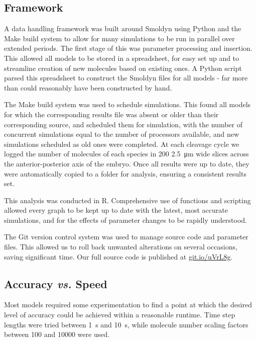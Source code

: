 \documentclass[11pt,a4paper,twocolumn]{article}
\begin{document}
\subsection{Framework}
A data handling framework was built around Smoldyn using Python and the Make build system to allow for many simulations to be run in parallel over extended periods. The first stage of this was parameter processing and insertion. This allowed all models to be stored in a spreadsheet, for easy set up and to streamline creation of new molecules based on existing ones. A Python script parsed this spreadsheet to construct the Smoldyn files for all models - far more than could reasonably have been constructed by hand. 

The Make build system was used to schedule simulations. This found all models for which the corresponding results file was absent or older than their corresponding source, and scheduled them for simulation, with the number of concurrent simulations equal to the number of processors available, and new simulations scheduled as old ones were completed. At each cleavage cycle we logged the number of molecules of each species in 200 \SI{2.5}{\micro\metre} wide slices across the anterior-posterior axis of the embryo. Once all results were up to date, they were automatically copied to a folder for analysis, ensuring a consistent results set.

This analysis was conducted in R. Comprehensive use of functions and scripting allowed every graph to be kept up to date with the latest, most accurate simulations, and for the effects of parameter changes to be rapidly understood.

The Git version control system was used to manage source code and parameter files. This allowed us to roll back unwanted alterations on several occasions, saving significant time. Our full source code is published at \url{git.io/uVrL8g}.

\subsection{Accuracy \textit{vs.} Speed}
Most models required some experimentation to find a point at which the desired level of accuracy could be achieved within a reasonable runtime. Time step lengths were tried between \SI{1}{s} and \SI{10}{s}, while molecule number scaling factors between \num{100} and \num{10000} were used. 
\end{document}
